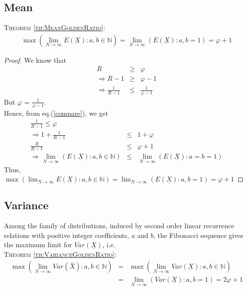 \begin{multicols}{2}
\subsection{Mean}\label{subsection-10.1}
\textsc{Theorem {\ref{th:MeanGoldenRatio}}:}
\begin{eqnarray*}
\label{MeanMax1}
\max{\left(\lim_{N\rightarrow \infty} E(\underline{X}): a, b \in \mathbb N\right)} = \lim_{N \rightarrow \infty}\left(E(\underline{X}) : a,b = 1\right) = \varphi + 1
\end{eqnarray*}
\begin{proof}\renewcommand{\qedsymbol}{} 
 We know that 
\begin{eqnarray}
 R &\geq& \varphi\nonumber\\
 \Rightarrow R-1 &\geq& \varphi -1 \nonumber\\
\Rightarrow \frac{1}{R-1} &\leq& \frac{1}{\varphi-1}\label{eq-10.1}
 \end{eqnarray}
 But $\varphi$ = $\displaystyle{\frac{1}{\varphi-1}}$. \\Hence, from eq.(\ref{compare}), we get
{\fontsize{8}{9}\selectfont\begin{eqnarray}
\frac{1}{R-1} \leq \varphi\nonumber\\
\Rightarrow 1 + \frac{1}{R-1} &\leq& 1+\varphi\\\label{eq-10.2}
\displaystyle{\frac{R}{R-1}} &\leq& \varphi + 1 \nonumber\\
\Rightarrow \lim_{N\rightarrow \infty}\left(E(\underline{X}):a,b\in \mathbb N\right) &\leq& \lim_{N\rightarrow \infty}\left(E(\underline{X}): a = b = 1\right)\label{eq-10.3}
\end{eqnarray}}
Thus, \\
$\max{\left(\displaystyle{\lim_{N\rightarrow \infty}} E(\underline{X}): a, b \in \mathbb N\right)} = \displaystyle{\lim_{N \rightarrow \infty}}\left(E(\underline{X}) : a,b = 1\right) = \varphi + 1$
\end{proof}

\subsection{Variance}\label{subsection-10.2}

Among the family of distributions, induced by second order linear recurrence relations with positive integer coefficients, $a$ and $b$, the Fibonacci sequence gives the maximum limit for $Var(\underline{X})$, i.e.\\
\textsc{Theorem {\ref{th:VarianceGoldenRatio}}:}
{\fontsize{6}{7}\selectfont\begin{eqnarray}
\max{\left(\lim_{N\rightarrow \infty}Var(\bar{X}): a,b \in \mathbb N\right)}&=& \max{\left(\lim_{N\rightarrow \infty}Var(\underline{X}): a,b \in \mathbb N\right)}\\\label{eq-10.4}
 &=& \lim_{N \rightarrow \infty}\left(Var(\underline{X}):a,b=1\right) = 2\varphi + 1\label{eq-10.5}
\end{eqnarray}}


\end{multicols}
